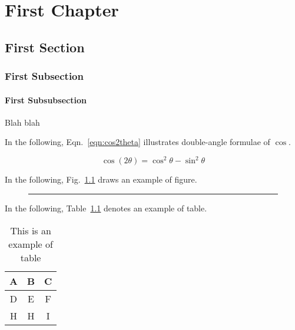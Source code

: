 \documentclass[11pt]{book}
\begin{document}
\pagestyle{plain} %

\tableofcontents
\listoffigures
\listoftables

\clearpage

\chapter{First Chapter}

\setcounter{page}{1}

\section{First Section}

\subsection{First Subsection}

\subsubsection{First Subsubsection}

Blah blah

In the following, Eqn.~\ref{eqn:cos2theta} illustrates double-angle formulae of $\cos$. %

\begin{equation}
\label{eqn:cos2theta}
\cos (2\theta) = \cos^2 \theta - \sin^2 \theta
\end{equation}

\newpage

In the following, Fig.~\ref{fig:dum1} draws an example of figure.
\begin{figure}[ht]
\begin{center}
\rule{0.5\linewidth}{0.35\linewidth}
\caption[Long caption figure]{\blindtext}
\label{fig:dum1}
\end{center}
\end{figure}

In the following, Table~\ref{tbl:table1} denotes an example of table.
\begin{table}[ht]
\caption[Table example]{This is an example of table}
\label{tbl:table1}
\centering
\begin{tabular}{c c c}
\hline
A & B & C \tabularnewline \hline
\rowcolor{lightgray}
D & E & F \tabularnewline \hline
H & H & I \tabularnewline \hline
\end{tabular}
\end{table}
\end{document}
